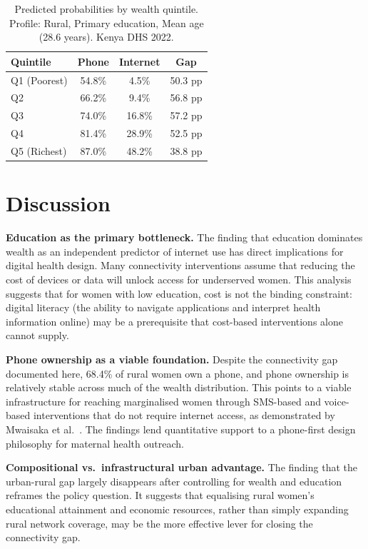 \documentclass[9pt,twoside]{pnas-new}
\begin{document}
\begin{table}[H]
\centering
\caption{Predicted probabilities by wealth quintile. Profile: Rural,
Primary education, Mean age (28.6 years). Kenya DHS 2022.}
\label{tab:predprobs}
\begin{tabular}{@{}lccc@{}}
\toprule
Quintile & Phone & Internet & Gap \\
\midrule
Q1 (Poorest) & 54.8\% & 4.5\%  & 50.3 pp \\
Q2           & 66.2\% & 9.4\%  & 56.8 pp \\
Q3           & 74.0\% & 16.8\% & 57.2 pp \\
Q4           & 81.4\% & 28.9\% & 52.5 pp \\
Q5 (Richest) & 87.0\% & 48.2\% & 38.8 pp \\
\bottomrule
\end{tabular}
\end{table}

\section*{Discussion}

\textbf{Education as the primary bottleneck.} The finding that education
dominates wealth as an independent predictor of internet use has direct
implications for digital health design. Many connectivity interventions
assume that reducing the cost of devices or data will unlock access for
underserved women. This analysis suggests that for women with low
education, cost is not the binding constraint: digital literacy (the
ability to navigate applications and interpret health information online)
may be a prerequisite that cost-based interventions alone cannot supply.

\textbf{Phone ownership as a viable foundation.} Despite the connectivity
gap documented here, 68.4\% of rural women own a phone, and phone
ownership is relatively stable across much of the wealth distribution.
This points to a viable infrastructure for reaching marginalised women
through SMS-based and voice-based interventions that do not require
internet access, as demonstrated by Mwaisaka et al.\ \cite{mwaisaka2025}.
The findings lend quantitative support to a phone-first design philosophy
for maternal health outreach.

\textbf{Compositional vs.\ infrastructural urban advantage.} The finding
that the urban-rural gap largely disappears after controlling for wealth
and education reframes the policy question. It suggests that equalising
rural women's educational attainment and economic resources, rather than
simply expanding rural network coverage, may be the more effective lever
for closing the connectivity gap.
\end{document}
